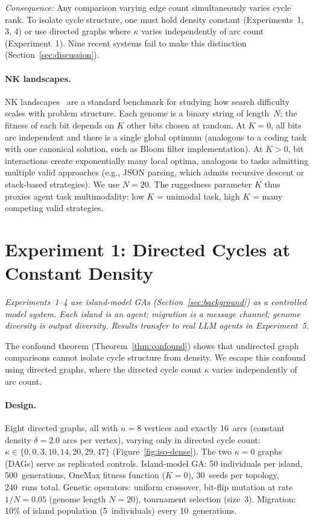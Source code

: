 \documentclass[runningheads]{llncs}
\begin{document}
\noindent
\textit{Consequence:} Any comparison varying edge count simultaneously
varies cycle rank. To isolate cycle structure, one must hold density
constant (Experiments~1, 3, 4) or use directed graphs where $\kappa$
varies independently of arc count (Experiment~1). Nine recent systems
fail to make this distinction (Section~\ref{sec:discussion}).

\paragraph{NK landscapes.}
NK landscapes~\cite{kauffman1993origins} are a standard benchmark for
studying how search difficulty scales with problem structure. Each
genome is a binary string of length~$N$; the fitness of each bit
depends on $K$ other bits chosen at random. At $K = 0$, all bits are
independent and there is a single global optimum (analogous to a
coding task with one canonical solution, such as Bloom filter
implementation). At $K > 0$, bit interactions create exponentially
many local optima, analogous to tasks admitting multiple valid
approaches (e.g., JSON parsing, which admits recursive descent or
stack-based strategies). We use $N = 20$. The ruggedness parameter
$K$ thus proxies agent task multimodality: low $K$ = unimodal task,
high $K$ = many competing valid strategies.

\section{Experiment 1: Directed Cycles at Constant Density}
\label{sec:exp1}

\emph{Experiments~1--4 use island-model GAs (Section~\ref{sec:background})
as a controlled model system. Each island is an agent; migration is a
message channel; genome diversity is output diversity. Results
transfer to real LLM agents in Experiment~5.}

The confound theorem (Theorem~\ref{thm:confound}) shows that
undirected graph comparisons cannot isolate cycle structure from
density. We escape this confound using directed graphs, where the
directed cycle count $\kappa$ varies independently of arc count.

\paragraph{Design.}
Eight directed graphs, all with $n = 8$ vertices and exactly 16~arcs
(constant density $\delta = 2.0$ arcs per vertex), varying only in
directed cycle count:
$\kappa \in \{0, 0, 3, 10, 14, 20, 29, 47\}$ (Figure~\ref{fig:iso-dense}). The two $\kappa = 0$
graphs (DAGs) serve as replicated controls. Island-model GA: 50
individuals per island, 500~generations, OneMax fitness function
($K = 0$), 30~seeds per topology, 240~runs total. Genetic operators:
uniform crossover, bit-flip mutation at rate $1/N = 0.05$
(genome length $N = 20$), tournament selection (size~3). Migration:
10\% of island population (5~individuals) every 10~generations.
\end{document}

